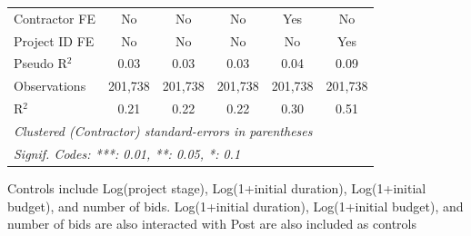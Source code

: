\documentclass[
]{article}
\begin{document}
\begin{table}[htbp]
\begin{tabular}{lccccc}
      Contractor FE                & No            & No            & No            & Yes           & No\\  
      Project ID FE                & No            & No            & No            & No            & Yes\\  
      Pseudo R$^2$                 & 0.03          & 0.03          & 0.03          & 0.04          & 0.09\\  
      Observations                 & 201,738       & 201,738       & 201,738       & 201,738       & 201,738\\  
      R$^2$                        & 0.21          & 0.22          & 0.22          & 0.30          & 0.51\\  
      \midrule
      \multicolumn{6}{l}{\emph{Clustered (Contractor) standard-errors in parentheses}}\\
      \multicolumn{6}{l}{\emph{Signif. Codes: ***: 0.01, **: 0.05, *: 0.1}}\\
   \end{tabular}
   
   \par \raggedright 
   Controls include Log(project stage), Log(1+initial duration), Log(1+initial budget), and number of bids. Log(1+initial duration), Log(1+initial budget), and number of bids are also interacted with Post are also included as controls
\end{table}
\end{document}
